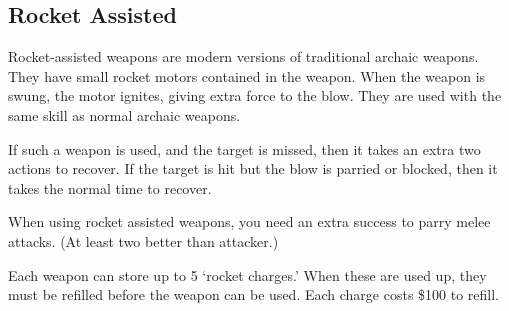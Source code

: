 \documentclass[twoside]{book}
\begin{document}
\begin{multicols}{2}
    


\hspace{-2ex}
\vspace{1ex}


    


\hspace{-2ex}
\vspace{1ex}


    
\end{multicols}
  
    

\subsection{Rocket Assisted}
    
    {  
     Rocket-assisted weapons are modern versions of
               traditional archaic weapons. They have small rocket motors
               contained in the weapon. When the weapon is swung, the
               motor ignites, giving extra force to the blow. They are
               used with the same skill as normal archaic weapons.
               
    }
  
    {  
     If such a weapon is used, and the target is missed,
               then it takes an extra two actions to recover. If the
               target is hit but the blow is parried or blocked, then it
               takes the normal time to recover. 
    }
  
    {  
     When using rocket assisted weapons, you need an
               extra success to parry melee attacks. (At least two better
               than attacker.) 
    }
  
    {  
     Each weapon can store up to 5 `rocket
               charges.' When these are used up, they must be
               refilled before the weapon can be used. Each charge costs
               \$100 to refill. 
    }
  
\end{document}

